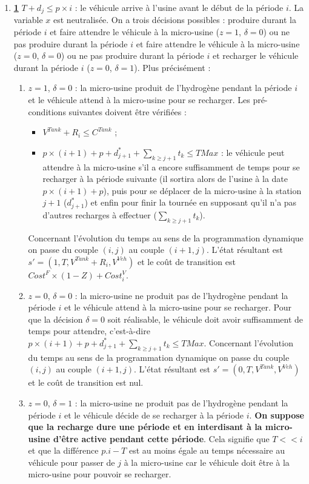 \begin{enumerate}
	
	\item \underline{\textbf{1}} $T+d_j\leq p\times i$ : le véhicule arrive à l'usine avant le début de la période $i$.
	La variable $x$ est neutralisée. On a trois décisions possibles : produire durant la période $i$ et faire attendre le véhicule à la micro-usine ($z=1$, $\delta=0$) ou ne pas produire durant la période $i$ et faire attendre le véhicule à la micro-usine ($z=0$, $\delta=0$) ou ne pas produire durant la période $i$ et recharger le véhicule durant la période $i$ ($z=0$, $\delta=1$). Plus précisément :
	\begin{enumerate}[label=\arabic*)]
		\item $z=1$, $\delta=0$ : la micro-usine produit de l'hydrogène pendant la période $i$ et le véhicule attend à la micro-usine pour se recharger. Les pré-conditions suivantes doivent être vérifiées :
		\begin{itemize}[label=$\square$]
			\item $V^{Tank} + R_i \leq C^{Tank}$ ;
			\item $p \times (i+1) +p+d^*_{j+1} + \sum_{k\geq j+1}t_k \leq TMax$ : le véhicule peut attendre à la micro-usine s'il a encore suffisamment de temps pour se recharger à la période suivante (il sortira alors de l'usine à la date $p \times (i+1) +p$), puis pour se déplacer de la micro-usine à la station $j+1$ ($d^*_{j+1}$) et enfin pour finir la tournée en supposant qu'il n'a pas d'autres recharges à effectuer ($\sum_{k\geq j+1}t_k$).
		\end{itemize}
		Concernant l'évolution du temps au sens de la programmation dynamique on passe du couple $(i,j)$ au couple $(i+1,j)$. L'état résultant est $s'=(1, T,V^{Tank} + R_i, V^{Veh} )$ et le coût de transition est $Cost^F \times (1-Z) + Cost_i^V$.
		
		\item $z=0$, $\delta=0$ : la micro-usine ne produit pas de l'hydrogène pendant la période $i$ et le véhicule attend à la micro-usine pour se recharger.
		Pour que la décision $\delta= 0$ soit réalisable, le véhicule doit avoir suffisamment de temps pour attendre, c'est-à-dire $p \times (i+1) +p+d^*_{j+1} + \sum_{k\geq j+1}t_k \leq TMax$.
		Concernant l'évolution du temps au sens de la programmation dynamique on passe du couple $(i,j)$ au couple $(i+1,j)$. L'état résultant est $s'=(0,T, V^{Tank},V^{Veh})$ et le coût de transition est nul.
		
		
		\item $z=0$, $\delta=1$ : la micro-usine ne produit pas de l'hydrogène pendant la période $i$ et le véhicule décide de se recharger à la période $i$.	
		\textbf{On suppose que la recharge dure une période et en interdisant à la micro-usine d'être active pendant cette période}. Cela signifie que $T << i$ et que la différence $p.i - T$ est au moins égale au temps nécessaire au véhicule pour passer de $j$ à la micro-usine car le véhicule doit être à la micro-usine pour pouvoir se recharger.
		

\end{enumerate}
\end{enumerate}
